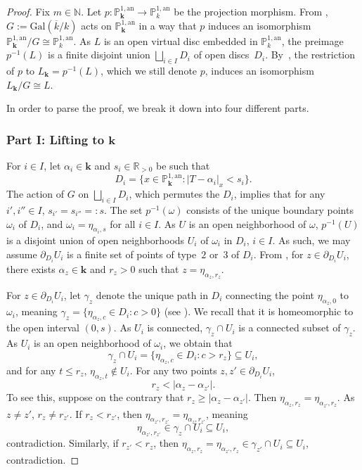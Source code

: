 \documentclass[JEP,XML,SOM,Unicode,NoFloatCountersInSection,published]{cedram}
\newcommand{\bbk}{{\boldsymbol{k}}}%
\theoremstyle{definition}
\begin{document}
\begin{proof}
Fix $m \in \mathbb{N}$. Let $p: \mathbb{P}_{\bbk}^{1, \mathrm{an}} \to \mathbb{P}_k^{1, \mathrm{an}}$ be the projection morphism. From \cite[Cor.\,1.3.6]{Ber90}, $G:=\mathrm{Gal}(\overline{k}/k)$ acts on $\mathbb{P}^{1, \mathrm{an}}_{\bbk}$ in a way that $p$ induces an isomorphism $\mathbb{P}_{\bbk}^{1, \mathrm{an}}/G \cong \mathbb{P}_k^{1, \mathrm{an}}$. As $L$ is an open virtual disc embedded in $\mathbb{P}_k^{1, \mathrm{an}}$, the preimage $p^{-1}(L)$ is a finite disjoint union $\bigsqcup_{i \in I} D_i$ of open discs~$D_i$. By~\loccit, the restriction of $p$ to $L_{\bbk}=p^{-1}(L)$, which we still denote $p$, induces an isomorphism $L_{\bbk}/G \cong L$.

In order to parse the proof, we break it down into four different parts.

\subsubsection*{Part I: Lifting to $\bbk$}
For $i \in I$, let $\alpha_i \in \bbk$ and $s_i \in \mathbb{R}_{>0}$ be such that
\[
D_i=\{x \in \mathbb{P}_{\bbk}^{1, \mathrm{an}} :|T-\alpha_i|_x<s_i\}.
\]
The action of $G$ on $\bigsqcup_{i \in I}D_i$, which permutes the $D_i$, implies that for any $i', i'' \in I$, $s_{i'}=s_{i''}=:s$. The set $p^{-1}(\omega)$ consists of the unique boundary points $\omega_i$ of $D_i$, and $\omega_i=\eta_{\alpha_i, s}$ for all $i \in I$.
As $U$ is an open neighborhood of $\omega$, $p^{-1}(U)$ is a disjoint union of open neighborhoods $U_i$ of $\omega_i$ in $D_i$, $i \in I$. As such, we may assume $\partial_{D_i}{U_i}$ is a finite set of points of type~$2$ or~3 of $D_i$.
From \cite[Prop.\,2.3]{une}, for $z \in \partial_{D_i}{U_i}$, there exists $\alpha_{z} \in \bbk$ and $r_{z}>0$ such that $z=\eta_{\alpha_z, r_z}$.

For $z \in \partial_{D_{i}} U_{i}$, let $\gamma_z$ denote the unique path in $D_{i}$ connecting the point $\eta_{\alpha_z, 0}$ to~$\omega_{i}$, meaning $\gamma_z=\{\eta_{\alpha_z, c} \in D_{i}: c>0\}$ (see \cite[Rem.\,1.8.26]{doktoratura}). We recall that it is homeomorphic to the open interval $(0, s)$. As $U_{i}$ is connected, $\gamma_z \cap U_{i}$ is a connected subset of $\gamma_z$. As $U_{i}$ is an open neighborhood of $\omega_{i}$, we obtain that
\[
\gamma_z \cap U_i=\{\eta_{\alpha_z, c} \in D_{i}: c>r_z\} \subseteq U_{i},
\]
and for any $t \leqslant r_z$, $\eta_{\alpha_z, t} \notin U_{i}$. For any two points $z, z' \in \partial_{D_i} U_i$,
\begin{equation} \label{5.3.1}
r_z < |\alpha_z-\alpha_{z'}|.
\end{equation}
To see this, suppose on the contrary that $r_z \geqslant |\alpha_z-\alpha_{z'}|$. Then $\eta_{\alpha_z, r_z}=\eta_{\alpha_{z'}, r_z}$. As~$z \neq z'$, $r_z \neq r_{z'}$. If $r_{z}< r_{z'}$, then $\eta_{\alpha_{z'}, r_{z'}}=\eta_{\alpha_z, r_{z'}}$, meaning
\[
\eta_{\alpha_{z'}, r_{z'}} \in \gamma_z \cap U_i \subseteq U_i,
\]
contradiction. Similarly, if $r_{z'}< r_{z}$, then $\eta_{\alpha_z, r_z}=\eta_{\alpha_{z'}, r_z} \in \gamma_{z'} \cap U_i \subseteq U_i$, contradiction.


\end{proof}
\end{document}
